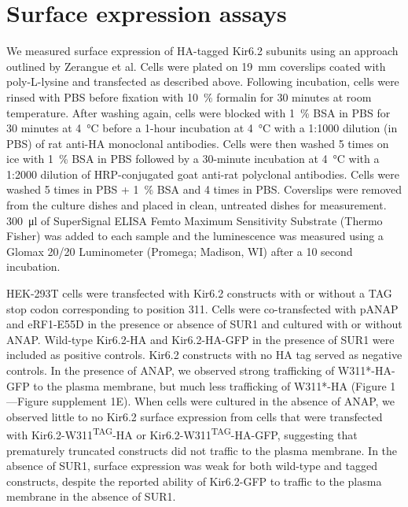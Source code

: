 \section{Surface expression assays}
We measured surface expression of HA-tagged Kir6.2 subunits using an approach outlined by Zerangue et al.
Cells were plated on \SI{19}{\milli\metre} coverslips coated with poly-L-lysine and transfected as described above.
Following incubation, cells were rinsed with PBS before fixation with \SI{10}{\percent} formalin for 30 minutes at room temperature.
After washing again, cells were blocked with \SI{1}{\percent} BSA in PBS for 30 minutes at \SI{4}{\degreeCelsius} before a 1-hour incubation at \SI{4}{\degreeCelsius} with a 1:1000 dilution (in PBS) of rat anti-HA monoclonal antibodies.
Cells were then washed 5 times on ice with \SI{1}{\percent} BSA in PBS followed by a 30-minute incubation at \SI{4}{\degreeCelsius} with a 1:2000 dilution of HRP-conjugated goat anti-rat polyclonal antibodies.
Cells were washed 5 times in PBS + \SI{1}{\percent} BSA and 4 times in PBS.
Coverslips were removed from the culture dishes and placed in clean, untreated dishes for measurement.
\SI{300}{\micro\litre} of SuperSignal ELISA Femto Maximum Sensitivity Substrate (Thermo Fisher) was added to each sample and the luminescence was measured using a Glomax 20/20 Luminometer (Promega; Madison, WI) after a 10 second incubation.

HEK-293T cells were transfected with Kir6.2 constructs with or without a TAG stop codon corresponding to position 311.
Cells were co-transfected with pANAP and eRF1-E55D in the presence or absence of SUR1 and cultured with or without ANAP.
Wild-type Kir6.2-HA and Kir6.2-HA-GFP in the presence of SUR1 were included as positive controls.
Kir6.2 constructs with no HA tag served as negative controls.
In the presence of ANAP, we observed strong trafficking of W311*-HA-GFP to the plasma membrane, but much less trafficking of W311*-HA (Figure 1—Figure supplement 1E).
When cells were cultured in the absence of ANAP, we observed little to no Kir6.2 surface expression from cells that were transfected with Kir6.2-W311\textsuperscript{TAG}-HA or Kir6.2-W311\textsuperscript{TAG}-HA-GFP, suggesting that prematurely truncated constructs did not traffic to the plasma membrane.
In the absence of SUR1, surface expression was weak for both wild-type and tagged constructs, despite the reported ability of Kir6.2-GFP to traffic to the plasma membrane in the absence of SUR1.


